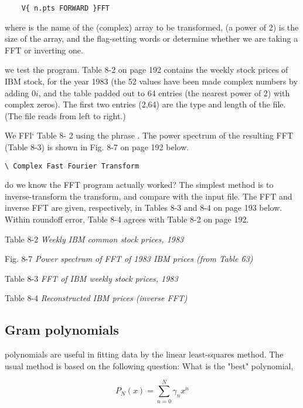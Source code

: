 \begin{lstlisting}
    V{ n.pts FORWARD }FFT
\end{lstlisting}

where  is the name of the (complex) array to be transformed,  (a power of 2) is the size of the array, and the flag-setting words  or  determine whether we are taking a FFT or inverting one.

 we test the program. Table 8-2 on page 192 contains the weekly stock prices of IBM stock, for the year 1983 (the 52 values have been made complex numbers by adding $0i$, and the table padded out to 64 entries (the nearest power of 2) with complex zeros). The first two entries (2,64) are the type and length of the file. (The file reads from left to right.)

We FFl‘ Table 8- 2 using the phrase . The power spectrum of the resulting FFT (Table 8-3) is shown in Fig. 8-7 on page 192 below.

\begin{lstlisting}
\ Complex Fast Fourier Transform

\end{lstlisting}

 do we know the FFT program actually worked? The simplest method is to inverse-transform the transform, and compare with the input file. The FFT and inverse FFT are given, respectively, in Tables 8-3 and 8-4 on page 193 below. Within roundoff error, Table 8-4 agrees with Table 8-2 on page 192.

Table 8-2 \textit{Weekly IBM common stock prices, 1983}

Fig. 8-7 \textit{Power spectrum of FFT of 1983 IBM prices (from Table 63)}

Table 8-3 \textit{FFT of IBM weekly stock prices, 1983}

Table 8-4 \textit{Reconstructed IBM prices (inverse FFT)}

\subsection{Gram polynomials}
 polynomials are useful in fitting data by the linear least-squares method. The usual method is based on the following question: What is the "best" polynomial,

\begin{equation}
P_N(x) = \sum_{n=0}^N \gamma_n x^n
\end{equation}


